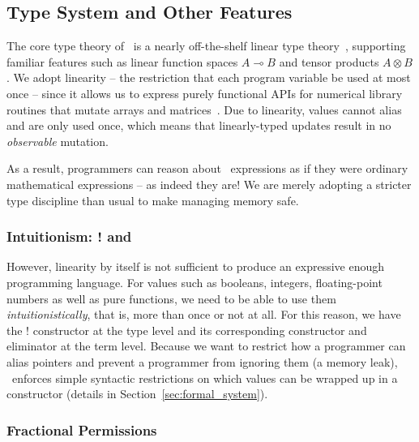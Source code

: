 \subsection{Type System and Other Features}

The core type theory of \lang\ is a nearly off-the-shelf linear type
theory~\cite{barber1996}, supporting familiar features such as linear function
spaces $A \multimap B$ and tensor products $A \otimes B$. We adopt linearity --
the restriction that each program variable be used at most once -- since it
allows us to express purely functional APIs for numerical library routines that
mutate arrays and matrices~\cite{Wadler90}. Due to linearity, values cannot
alias and are only used once, which means that linearly-typed updates result in
no \emph{observable} mutation.

As a result, programmers can reason about \lang\ expressions as if they
were ordinary mathematical expressions -- as indeed they are! We are
merely adopting a stricter type discipline than usual to make managing
memory safe.

\subsubsection{Intuitionism: ! and }

However, linearity by itself is not sufficient to produce an expressive enough
programming language. For values such as booleans, integers, floating-point
numbers as well as pure functions, we need to be able to use them
\emph{intuitionistically}, that is, more than once or not at all. For this
reason, we have the ! constructor at the type level and its corresponding
 constructor and  eliminator at
the term level. Because we want to restrict how a programmer can alias pointers
and prevent a programmer from ignoring them (a memory leak), \lang\ enforces
simple syntactic restrictions on which values can be wrapped up in a
 constructor (details in Section~\ref{sec:formal_system}).

\subsubsection{Fractional Permissions}

